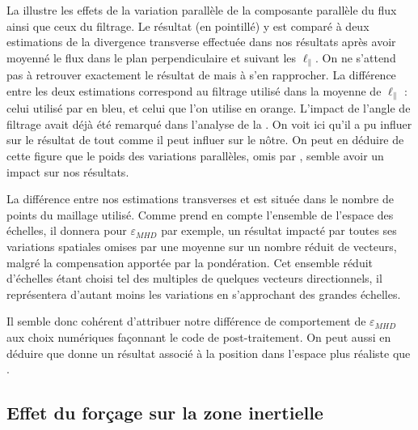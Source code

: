 La  illustre les effets de la variation parallèle de la composante parallèle du flux ainsi que ceux du filtrage. Le résultat  (en pointillé) y est comparé à deux estimations de la divergence transverse effectuée dans nos résultats après avoir moyenné le flux dans le plan perpendiculaire et suivant les $\ell_{\parallel}$. On ne s'attend pas à retrouver exactement le résultat de  mais à s'en rapprocher. La différence entre les deux estimations correspond au filtrage utilisé dans la moyenne de $\ell_{\parallel}$ : celui utilisé par  en bleu, et celui que l'on utilise en orange. L'impact de l'angle de filtrage avait déjà été remarqué dans l'analyse de la . On voit ici qu'il a pu influer sur le résultat de  tout comme il peut influer sur le nôtre. On peut en déduire de cette figure que le poids des variations parallèles, omis par , semble avoir un impact sur nos résultats. 
 
 La différence entre nos estimations transverses et  est située dans le nombre de points du maillage utilisé. Comme  prend en compte l'ensemble de l'espace des échelles, il donnera pour $\varepsilon_{MHD}$ par exemple, un résultat impacté par toutes ses variations spatiales omises par une moyenne sur un nombre réduit de vecteurs, malgré la compensation apportée par la pondération. Cet ensemble réduit d'échelles étant choisi tel des multiples de quelques vecteurs directionnels, il représentera d'autant moins les variations en s'approchant des grandes échelles.

 Il semble donc cohérent d'attribuer notre différence de comportement de $\varepsilon_{MHD}$ aux choix numériques façonnant le code de post-traitement. On peut aussi en déduire que  donne un résultat associé à la position dans l'espace  plus réaliste que .
 
 \subsection{Effet du forçage sur la zone inertielle} \label{sec-322}
 
